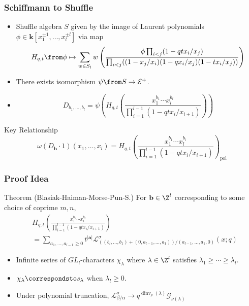 \documentclass{beamer}
\DeclareMathOperator{\dinv}{dinv}
\newcommand{\Gcal}{\mathcal{G}}
\newcommand{\Lcal}{{\mathcal L}}
\newcommand{\Ecal}{{\mathcal E}}
\newcommand{\bb}{{\mathbf b}}
\newcommand{\aA}{{\mathbf a}}
\newcommand{\kk}{{\mathbf k}}
\DeclareMathOperator{\pol}{pol}
\begin{document}
\begin{frame}
  \frametitle{Schiffmann to Shuffle}
  \begin{itemize}
  \item Shuffle algebra \(S\) given by the image of Laurent
    polynomials \(\phi \in \kk[x_1^{\pm 1},\ldots, x_l^{\pm l}]\) via
    map \pause\[
      H_{q,t}\from \phi \mapsto \sum_{w \in S_l} w \left( \frac{\phi \prod_{i<j}
          (1-qt x_i/x_j)}{\prod_{i<j}((1-x_j/x_i)(1-q x_i/x_j)(1-t x_i/x_j))} \right)
    \]\pause
  \item There exists isomorphism \(\psi \from S \to \Ecal^+\).\pause
  \item \[
    D_{b_1,\ldots,b_l} = \psi \left(H_{q,t}\left(\frac{x_1^{b_1}\cdots
        x_l^{b_l}}{\prod_{i=1}^{l-1} (1-qt x_i/x_{i+1})}  \right)\right)
  \]\pause
  \end{itemize}
  \begin{block}{Key Relationship}
    \[
      \omega(D_\bb \cdot 1)(x_1,\ldots,x_l) = H_{q,t}\left(\frac{x_1^{b_1}\cdots
        x_l^{b_l}}{\prod_{i=1}^{l-1} (1-qt x_i/x_{i+1})}  \right)_{\pol}
    \]
  \end{block}
\end{frame}
\begin{frame}
  \frametitle{Proof Idea}
  \begin{block}{Theorem (Blasiak-Haiman-Morse-Pun-S.)}
    For \(\bb \in \Z^l\) corresponding to some choice of coprime \(m,n\),
    \begin{align*}
&H_{q,t}\left(\frac{x_1^{b_1}\cdots
                     x_l^{b_l}}{\prod_{i=1}^{l-1} (1-qt x_i/x_{i+1})}  \right)\\
      &= \sum_{a_1,\ldots,a_{l-1} \geq 0}
t^{|\aA|} \Lcal^\sigma_{((b_l,\ldots,b_1)+(0,a_{l-1},\ldots,a_1))/(a_{l-1},\ldots,a_1,0)}(x;q)
    \end{align*}
  \end{block}\pause
  \begin{itemize}
  \item Infinite series of \(GL_l\)-characters \(\chi_\lambda\) where
    \(\lambda \in \Z^l\) satisfies \(\lambda_1 \geq \cdots \geq
    \lambda_l\). \pause
  \item \(\chi_\lambda \correspondsto s_\lambda\) when \(\lambda_l \geq 0\).\pause
  \item Under polynomial truncation, \(\Lcal^\sigma_{\beta/\alpha} \to q^{\dinv_p(\lambda)}\Gcal_{\nu(\lambda)}\)
  \end{itemize}
\end{frame}
\end{document}
